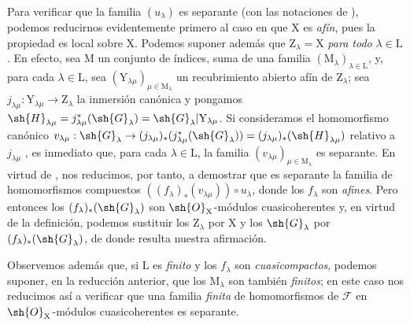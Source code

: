 \begin{env}[11.9.3]
\label{IV.11.9.3}
Para verificar que la familia $(u_\lambda)$ es separante (con las notaciones de ), podemos reducirnos evidentemente primero al caso en que $\mathrm{X}$ es \emph{afín}, pues la propiedad es local sobre $\mathrm{X}$.
Podemos suponer además que $\mathrm{Z}_\lambda=\mathrm{X}$ \emph{para todo} $\lambda\in\mathrm{L}$.
En efecto, sea $\mathrm{M}$ un conjunto de índices, suma de una familia $(\mathrm{M}_\lambda)_{\lambda\in\mathrm{L}}$, y, para cada $\lambda\in\mathrm{L}$, sea $(\mathrm{Y}_{\lambda\mu})_{\mu\in\mathrm{M}_\lambda}$ un recubrimiento abierto afín de $\mathrm{Z}_\lambda$; sea $j_{\lambda\mu}:\mathrm{Y}_{\lambda\mu}\to\mathrm{Z}_\lambda$ la inmersión canónica y pongamos $\sh{H}_{\lambda\mu}=j_{\lambda\mu}^*(\sh{G}_\lambda)=\sh{G}_\lambda|\mathrm{Y}_{\lambda\mu}$.
Si consideramos el homomorfismo canónico $v_{\lambda\mu}:\sh{G}_\lambda\to(j_{\lambda\mu})_*(j_{\lambda\mu}^*(\sh{G}_\lambda))=(j_{\lambda\mu})_*(\sh{H}_{\lambda\mu})$ relativo a $j_{\lambda\mu}$ , es inmediato que, para cada $\lambda\in\mathrm{L}$, la familia $(v_{\lambda\mu})_{\mu\in\mathrm{M}_\lambda}$ es separante.
En virtud de , nos reducimos, por tanto, a demostrar que es separante la familia de homomorfismos compuestos $((f_\lambda)_*(v_{\lambda\mu}))\circ u_\lambda$, donde los $f_\lambda$ son \emph{afines}.
Pero entonces los $(f_\lambda)_*(\sh{G}_\lambda)$ son $\sh{O}_\mathrm{X}$-módulos cuasicoherentes  y, en virtud de la definición, podemos sustituir los $\mathrm{Z}_\lambda$ por $\mathrm{X}$ y los $\sh{G}_\lambda$ por $(f_\lambda)_*(\sh{G}_\lambda)$, de donde resulta nuestra afirmación.

Observemos además que, si $\mathrm{L}$ es \emph{finito} y los $f_\lambda$ son \emph{cuasicompactos}, podemos suponer, en la reducción anterior, que los $\mathrm{M}_\lambda$ son también \emph{finitos}; en este caso nos reducimos así a verificar que una familia \emph{finita} de homomorfismos de $\mathscr{F}$ en $\sh{O}_\mathrm{X}$-módulos cuasicoherentes es separante.
\end{env}

